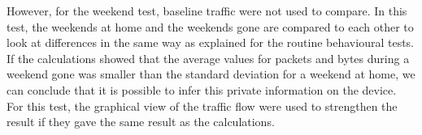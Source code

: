 However, for the weekend test, baseline traffic were not used to compare. In this test, the weekends at home and the weekends gone are compared to each other to look at differences in the same way as explained for the routine behavioural tests. If the calculations showed that the average values for packets and bytes during a weekend gone was smaller than the standard deviation for a weekend at home, we can conclude that it is possible to infer this private information on the device. For this test, the graphical view of the traffic flow were used to strengthen the result if they gave the same result as the calculations. 